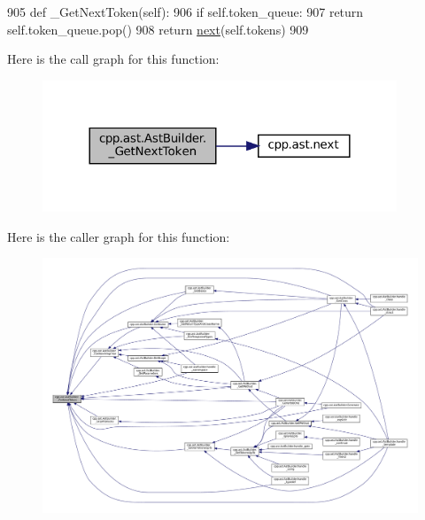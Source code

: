 \begin{DoxyCode}
905     \textcolor{keyword}{def }\_GetNextToken(self):
906         \textcolor{keywordflow}{if} self.token\_queue:
907             \textcolor{keywordflow}{return} self.token\_queue.pop()
908         \textcolor{keywordflow}{return} \hyperlink{namespacecpp_1_1ast_a39ad8261fef5e0a7c1c17c510541b66f}{next}(self.tokens)
909 
\end{DoxyCode}
Here is the call graph for this function\+:
\nopagebreak
\begin{figure}[H]
\begin{center}
\leavevmode
\includegraphics[width=300pt]{classcpp_1_1ast_1_1AstBuilder_ac22b5683a8f1a86a49751d6d0bcd4b84_cgraph}
\end{center}
\end{figure}
Here is the caller graph for this function\+:
\nopagebreak
\begin{figure}[H]
\begin{center}
\leavevmode
\includegraphics[width=350pt]{classcpp_1_1ast_1_1AstBuilder_ac22b5683a8f1a86a49751d6d0bcd4b84_icgraph}
\end{center}
\end{figure}
\mbox{\label{classcpp_1_1ast_1_1AstBuilder_a89bbfbdcc6d029629f304aa9b643faf3}} 
